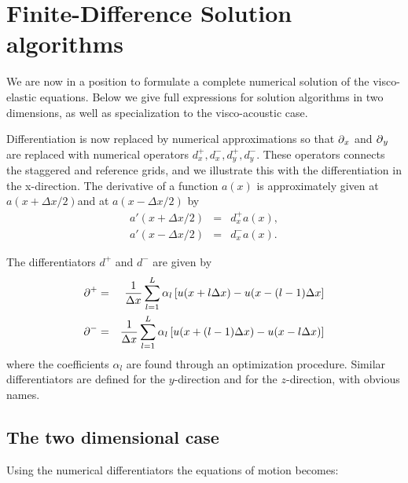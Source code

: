 \documentclass[11pt]{article}
\begin{document}
\section{Finite-Difference Solution algorithms}
We are now in a position to formulate a complete numerical 
solution of the visco-elastic equations.
Below we give full expressions for
solution algorithms in two dimensions, as well
as specialization to the visco-acoustic case.

Differentiation is now replaced by numerical approximations so 
that $\mbox{$\partial$}_x$ and $\mbox{$\partial$}_y$ 
are replaced with numerical operators $d^+_x,d^-_x,d^+_y,d^-_y$.
These operators connects the staggered and reference grids, and we 
illustrate this with the differentiation
in the x-direction.
The derivative of a function $a(x)$ is approximately given at 
$a(x+\Delta x/2)$and
at $a(x-\Delta x/2)$ by
\begin{eqnarray}
a'(x+\Delta x/2) & = & d^+_x a(x),\nonumber\\
a'(x-\Delta x/2) & = & d^-_x a(x).
\end{eqnarray}

The differentiators $d^+$ and $d^-$ are given by
\citep{Holberg1987}
%
\begin{eqnarray}
   \mbox{$\partial$}^+ & = & \frac{1}{\Delta x}\sum_{l=1}^L \alpha_l\left[u(x +l\Delta x) -
		          u(x - (l-1)\Delta x\right]\nonumber\\	
   \mbox{$\partial$}^- & = & \frac{1}{\Delta x}\sum_{l=1}^L \alpha_l\left[u(x +(l-1)\Delta x) -
					          u(x - l\Delta x)\right]
\end{eqnarray}
where the coefficients $\alpha_l$ are found through an optimization procedure.
Similar differentiators are defined for the $y$-direction and for 
the $z$-direction, with obvious names.

\subsection{The two dimensional case}
Using the numerical differentiators the equations of motion becomes:
\end{document}
